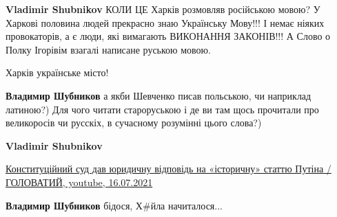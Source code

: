 \begin{itemize}
\begin{itemize}
 
\textbf{Vladimir Shubnikov} КОЛИ ЦЕ Харків розмовляв російською мовою? У
Харкові половина людей прекрасно знаю Українську Мову!!! І немає ніяких
провокаторів, а є люди, які вимагають ВИКОНАННЯ ЗАКОНІВ!!! А Слово о Полку
Ігорівім взагалі написане руською мовою.

 
Харків українське місто!

 
\textbf{Владимир Шубников} а якби Шевченко писав польською, чи наприклад
латиною?) Для чого читати староруською і де ви там щось прочитали про
великоросів чи русскіх, в сучасному розумінні цього слова?)

 
\textbf{Vladimir Shubnikov}

\href{https://www.youtube.com/watch?v=vvL0XGUc5qA}{%
Конституційний суд дав юридичну відповідь на «історичну» статтю Путіна / ГОЛОВАТИЙ, youtube, 16.07.2021%
%
}

 
\textbf{Владимир Шубников} бідося, Х\#йла начиталося...

 

\end{itemize}
\end{itemize}

